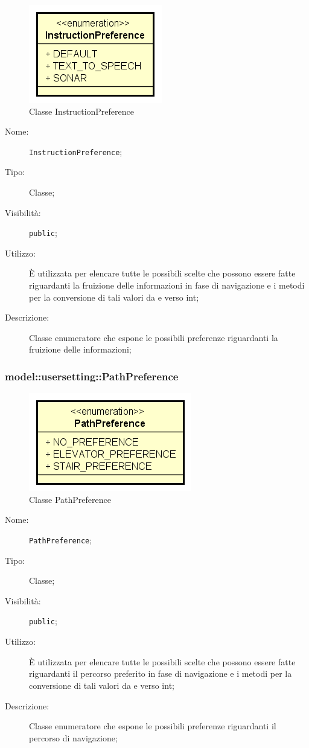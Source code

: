 \documentclass[../DefinizioneDiProdotto.tex]{subfiles}
\begin{document}
    \begin{figure}[H]
        \centering
        \includegraphics{img/InstructionPreference.png}
        \caption{Classe InstructionPreference}\label{fig:model::usersetting::InstructionPreference} 
    \end{figure}
    \begin{description}
\item[Nome:] \texttt{InstructionPreference};
\item[Tipo:] Classe;
\item[Visibilità:] \texttt{public};
\item[Utilizzo:] È utilizzata per elencare tutte le possibili scelte che possono essere fatte riguardanti la fruizione delle informazioni in fase di navigazione e i metodi per la conversione di tali valori da e verso int;
\item[Descrizione:] Classe enumeratore che espone le possibili preferenze riguardanti la fruizione delle informazioni;
\end{description}

\subsubsection{model::usersetting::PathPreference}

    \begin{figure}[H]
        \centering
        \includegraphics{img/PathPreference.png}
        \caption{Classe PathPreference}\label{fig:model::usersetting::PathPreference} 
    \end{figure}
    \begin{description}
\item[Nome:] \texttt{PathPreference};
\item[Tipo:] Classe;
\item[Visibilità:] \texttt{public};
\item[Utilizzo:] È utilizzata per elencare tutte le possibili scelte che possono essere fatte riguardanti il percorso preferito in fase di navigazione e i metodi per la conversione di tali valori da e verso int;
\item[Descrizione:] Classe enumeratore che espone le possibili preferenze riguardanti il percorso di navigazione;
\end{description}
\end{document}
